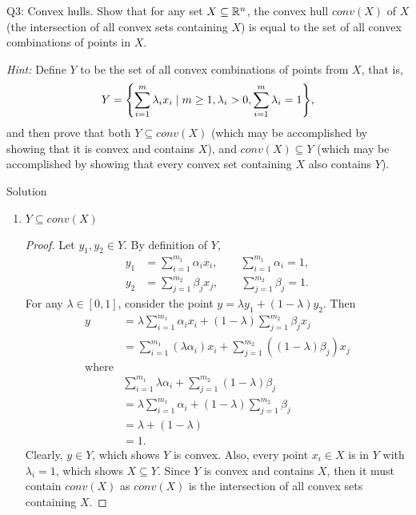 \documentclass{article}
\begin{document}
\begin{problem}
    {Q3: Convex hulls.}
    Show that for any set $X\subseteq\mathbb{R}^n$, the convex hull $conv(X)$ of $X$ (the intersection of all convex sets containing $X$) is equal to the set of all convex combinations of points in $X$.

    \textit{Hint:} Define $Y$ to be the set of all convex combinations of points from $X$, that is,
    \[
        Y=\braces*{\sum_{i=1}^m\lambda_ix_i\mid m\geq1, \lambda_i>0,\sum_{i=1}^m\lambda_i=1},
    \]
    and then prove that both $Y\subseteq conv(X)$ (which may be accomplished by showing that it is convex and contains $X$), and $conv(X)\subseteq Y$ (which may be accomplished by showing that every convex set containing $X$ also contains $Y$).
\end{problem}

\begin{solution}
    {Solution}
    \begin{enumerate}
        \item $Y\subseteq conv(X)$ {
            \begin{proof}
                Let $y_1, y_2\in Y$. By definition of $Y$,
                \begin{align*}
                    y_1 &= \sum_{i=1}^{m_1}\alpha_ix_i, \qquad \sum_{i=1}^{m_1}\alpha_i=1,\\
                    y_2 &= \sum_{j=1}^{m_2}\beta_jx_j, \qquad \sum_{j=1}^{m_2}\beta_j=1.
                \end{align*}
                For any $\lambda\in[0,1]$, consider the point $y=\lambda y_1+(1-\lambda)y_2$. Then
                \begin{align*}
                    y&=\lambda\sum_{i=1}^{m_1}\alpha_ix_i+(1-\lambda)\sum_{j=1}^{m_2}\beta_jx_j\\
                    &=\sum_{i=1}^{m_1}(\lambda\alpha_i)x_i+\sum_{j=1}^{m_2}((1-\lambda)\beta_j)x_j\\
                    \text{where}\\
                    &\sum_{i=1}^{m_1}\lambda\alpha_i+\sum_{j=1}^{m_2}(1-\lambda)\beta_j\\
                    &=\lambda\sum_{i=1}^{m_1}\alpha_i+(1-\lambda)\sum_{j=1}^{m_2}\beta_j\\
                    &=\lambda+(1-\lambda)\\
                    &=1.
                \end{align*}
                Clearly, $y\in Y$, which shows $Y$ is convex. Also, every point $x_i\in X$ is in $Y$ with $\lambda_i=1$, which shows $X\subseteq Y$. Since $Y$ is convex and contains $X$, then it must contain $conv(X)$ as $conv(X)$ is the intersection of all convex sets containing $X$.

\end{proof}}
\end{enumerate}
\end{solution}
\end{document}
